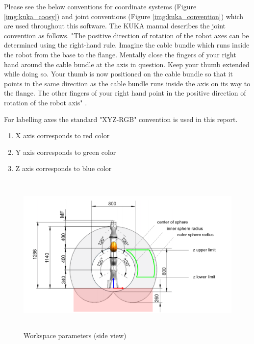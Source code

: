 \documentclass[headsepline,footinclude=false,fontsize=11pt,paper=a4,listof=totoc,bibliography=totoc,BCOR=12mm,DIV=14]{scrbook}
\begin{document}
Please see the below conventions for coordinate systems (Figure \ref{img:kuka_coosy}) and joint conventions (Figure \ref{img:kuka_convention}) which are used throughout this software. The KUKA manual describes the joint convention as follows. "The positive direction of rotation of the robot axes can be determined using the right-hand rule. Imagine the cable bundle which runs inside the robot from the base to the flange. Mentally close the fingers of your right hand around the cable bundle at the axis in question. Keep your thumb extended while doing so. Your thumb is now positioned on the cable bundle so that it points in the same direction as the cable bundle runs inside the axis on its way to the flange. The other fingers of your right hand point in the positive direction of rotation of the robot axis" \cite[p.~87]{KukaManual}.

For labelling axes the standard "XYZ-RGB" convention is used in this report.

\begin{enumerate}
	\item X axis corresponds to red color
	\item Y axis corresponds to green color
	\item Z axis corresponds to blue color 
\end{enumerate}

\newpage
\begin{figure}[h!]
    \centering
    \includegraphics[height=8cm]{images/ws_params_side}
    \caption{Workspace parameters (side view) \cite[p.~36]{KukaManualFlange}}
    \label{fig:ws_params_side}
\end{figure}
\end{document}
